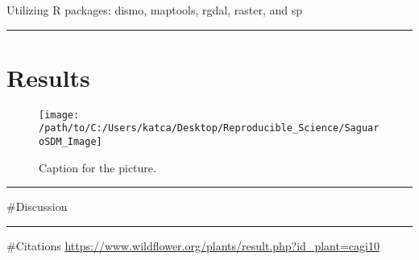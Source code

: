 \documentclass[
]{article}
\begin{document}
Utilizing R packages: dismo, maptools, rgdal, raster, and sp

\begin{center}\rule{0.5\linewidth}{\linethickness}\end{center}

\hypertarget{results}{%
\section{Results}\label{results}}

\begin{figure}
\centering
\texttt{[image: /path/to/C:/Users/katca/Desktop/Reproducible\_Science/SaguaroSDM\_Image]}
\caption{Caption for the picture.}
\end{figure}

\begin{center}\rule{0.5\linewidth}{\linethickness}\end{center}

\#Discussion

\begin{center}\rule{0.5\linewidth}{\linethickness}\end{center}

\#Citations
\url{https://www.wildflower.org/plants/result.php?id_plant=cagi10}
\end{document}
